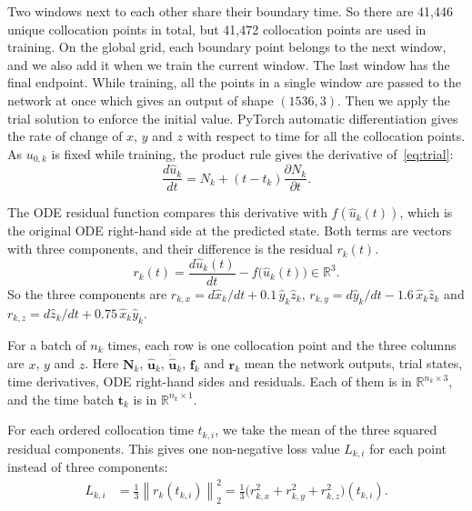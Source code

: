 \documentclass[conference,a4paper]{IEEEtran}
\begin{document}
Two windows next to each other share their boundary time. So there are 41,446 unique collocation points in total, but 41,472 collocation points are used in training. On the global grid, each boundary point belongs to the next window, and we also add it when we train the current window. The last window has the final endpoint. While training, all the points in a single window are passed to the network at once which gives an output of shape $(1536,3)$.
Then we apply the trial solution to enforce the initial value. PyTorch automatic differentiation gives the rate of change of $x$, $y$ and $z$ with respect to time for all the collocation points. As $u_{0,k}$ is fixed while training, the product rule gives the derivative of~\eqref{eq:trial}:
\[
\frac{d\hat{u}_k}{dt}
=N_k+(t-t_k)\frac{\partial N_k}{\partial t}.
\]

The ODE residual function compares this derivative with $f(\hat{u}_k(t))$, which is the original ODE right-hand side at the predicted state. Both terms are vectors with three components, and their difference is the residual $r_k(t)$.
\begin{equation}
r_k(t)
=\frac{d\hat{u}_k(t)}{dt}
 -f\bigl(\hat{u}_k(t)\bigr)
\in\mathbb{R}^{3}.
\label{eq:residual}
\end{equation}
So the three components are $r_{k,x}=d\hat{x}_k/dt+0.1\,\hat{y}_k\hat{z}_k$, $r_{k,y}=d\hat{y}_k/dt-1.6\,\hat{x}_k\hat{z}_k$ and $r_{k,z}=d\hat{z}_k/dt+0.75\,\hat{x}_k\hat{y}_k$.

For a batch of $n_k$ times, each row is one collocation point and the three columns are $x$, $y$ and $z$. Here $\mathbf{N}_k$, $\hat{\mathbf{u}}_k$, $\dot{\hat{\mathbf{u}}}_k$, $\mathbf{f}_k$ and $\mathbf{r}_k$ mean the network outputs, trial states, time derivatives, ODE right-hand sides and residuals. Each of them is in $\mathbb{R}^{n_k\times3}$, and the time batch $\mathbf{t}_k$ is in $\mathbb{R}^{n_k\times1}$.

For each ordered collocation time $t_{k,i}$, we take the mean of the three squared residual components. This gives one non-negative loss value $L_{k,i}$ for each point instead of three components:
\begin{equation}
\begin{aligned}
L_{k,i}
  &=\tfrac{1}{3}\left\|r_k(t_{k,i})\right\|_2^2=\tfrac{1}{3}\bigl(r_{k,x}^2+r_{k,y}^2+r_{k,z}^2\bigr)(t_{k,i}).
\end{aligned}
\label{eq:pointloss}
\end{equation}
\end{document}
